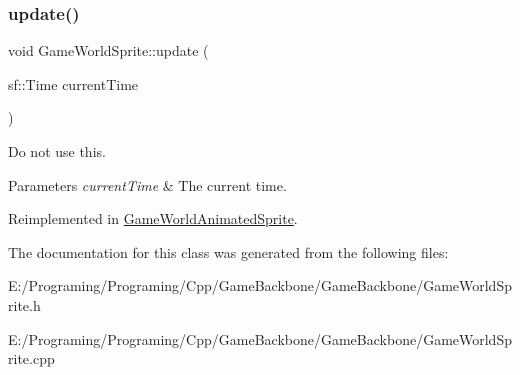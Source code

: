\subsubsection{\texorpdfstring{update()}{update()}}
{\footnotesize\ttfamily void Game\+World\+Sprite\+::update (\begin{DoxyParamCaption}\item[{sf\+::\+Time}]{current\+Time }\end{DoxyParamCaption})\hspace{0.3cm}{\ttfamily [virtual]}}



Do not use this. 


\begin{DoxyParams}{Parameters}
{\em current\+Time} & The current time.\\
\hline
\end{DoxyParams}


Reimplemented in \hyperlink{class_game_world_animated_sprite_a6fab62c5ed11541027a88c695a8b6147}{Game\+World\+Animated\+Sprite}.



The documentation for this class was generated from the following files\+:\begin{DoxyCompactItemize}
\item 
E\+:/\+Programing/\+Programing/\+Cpp/\+Game\+Backbone/\+Game\+Backbone/Game\+World\+Sprite.\+h\item 
E\+:/\+Programing/\+Programing/\+Cpp/\+Game\+Backbone/\+Game\+Backbone/Game\+World\+Sprite.\+cpp\end{DoxyCompactItemize}
